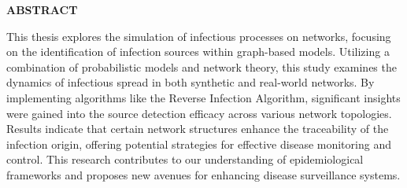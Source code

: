 \begin{center}
    \thispagestyle{empty} %
    \Large \textbf{ABSTRACT}\\[2cm]
\end{center}

\noindent
This thesis explores the simulation of infectious processes on networks, focusing on the identification of infection sources within graph-based models. Utilizing a combination of probabilistic models and network theory, this study examines the dynamics of infectious spread in both synthetic and real-world networks. By implementing algorithms like the Reverse Infection Algorithm, significant insights were gained into the source detection efficacy across various network topologies. Results indicate that certain network structures enhance the traceability of the infection origin, offering potential strategies for effective disease monitoring and control. This research contributes to our understanding of epidemiological frameworks and proposes new avenues for enhancing disease surveillance systems.